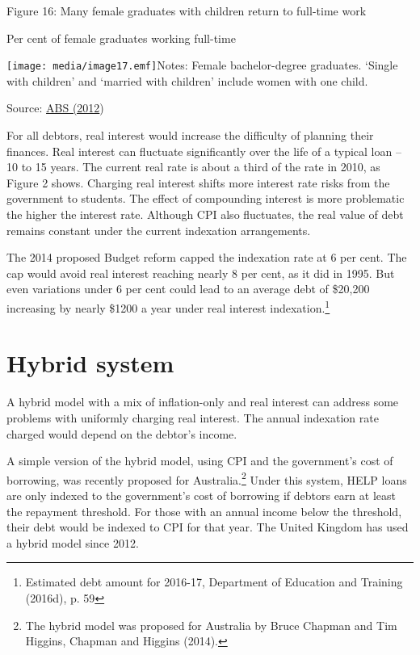 \documentclass[]{book}
\begin{document}
\protect\hypertarget{_Ref333507740}{}{}Figure 16: Many female graduates with children return to full-time work

Per cent of female graduates working full-time

\texttt{[image: media/image17.emf]}Notes: Female bachelor-degree graduates. `Single with children' and `married with children' include women with one child.

Source: \protect\hyperlink{_ENREF_1}{ABS (2012})

For all debtors, real interest would increase the difficulty of planning their finances. Real interest can fluctuate significantly over the life of a typical loan -- 10 to 15 years. The current real rate is about a third of the rate in 2010, as Figure 2 shows. Charging real interest shifts more interest rate risks from the government to students. The effect of compounding interest is more problematic the higher the interest rate. Although CPI also fluctuates, the real value of debt remains constant under the current indexation arrangements.

The 2014 proposed Budget reform capped the indexation rate at 6 per cent. The cap would avoid real interest reaching nearly 8 per cent, as it did in 1995. But even variations under 6 per cent could lead to an average debt of \$20,200 increasing by nearly \$1200 a year under real interest indexation.\footnote{Estimated debt amount for 2016-17, Department of Education and Training (2016d), p. 59}

\section{Hybrid system}\label{hybrid-system}

A hybrid model with a mix of inflation-only and real interest can address some problems with uniformly charging real interest. The annual indexation rate charged would depend on the debtor's income.

A simple version of the hybrid model, using CPI and the government's cost of borrowing, was recently proposed for Australia.\footnote{The hybrid model was proposed for Australia by Bruce Chapman and Tim Higgins, Chapman and Higgins (2014).} Under this system, HELP loans are only indexed to the government's cost of borrowing if debtors earn at least the repayment threshold. For those with an annual income below the threshold, their debt would be indexed to CPI for that year. The United Kingdom has used a hybrid model since 2012.
\end{document}
